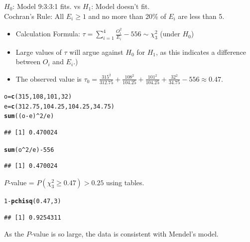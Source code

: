 \documentclass[t,xcolor=pdftex,dvipsnames,table]{beamer}\usepackage[]{graphicx}\usepackage[]{color}
\makeatletter
\newcommand{\hlnum}[1]{\textcolor[rgb]{0.686,0.059,0.569}{#1}}%
\newcommand{\hlopt}[1]{\textcolor[rgb]{0,0,0}{#1}}%
\newcommand{\hlstd}[1]{\textcolor[rgb]{0.345,0.345,0.345}{#1}}%
\newcommand{\hlkwb}[1]{\textcolor[rgb]{0.69,0.353,0.396}{#1}}%
\newcommand{\hlkwd}[1]{\textcolor[rgb]{0.737,0.353,0.396}{\textbf{#1}}}%
\newenvironment{kframe}{%
 \def\at@end@of@kframe{}%
 \ifinner\ifhmode%
  \def\at@end@of@kframe{\end{minipage}}%
  \begin{minipage}{\columnwidth}%
 \fi\fi%
 \def\FrameCommand##1{\hskip\@totalleftmargin \hskip-\fboxsep
 \colorbox{shadecolor}{##1}\hskip-\fboxsep
     \hskip-\linewidth \hskip-\@totalleftmargin \hskip\columnwidth}%
 \MakeFramed {\advance\hsize-\width
   \@totalleftmargin\z@ \linewidth\hsize
   \@setminipage}}%
 {\par\unskip\endMakeFramed%
 \at@end@of@kframe}
\newenvironment{knitrout}{}{} %
\makeatother
\begin{document}
\begin{frame}[fragile]{}

 $H_{0}$: Model 9:3:3:1 fits. vs $H_{1}$: Model doesn't fit. \\

 Cochran's Rule: All $E_{i} \geq 1$ and no more than 20\% of $E_{i}$ are less than 5. 

\begin{itemize}
\item Calculation Formula: $\tau = \sum_{i=1}^{4} \frac{O_{i}^2}{E_{i}} - 556 \sim \chi^2_{3}$ (under $H_{0}$)
\item Large values of $\tau$ will argue against $H_{0}$ for $H_{1}$, as this indicates a difference between $O_{i}$ and $E_{i}$.)
\item The observed value is $\tau_{0} = \frac{315^2}{312.75} + \frac{108^2}{104.25} + \frac{101^2}{104.25} + \frac{32^2}{34.75} - 556 \approx 0.47$. 
\end{itemize}

\begin{knitrout}
\color{fgcolor}\begin{kframe}
\begin{alltt}
\hlstd{o}\hlkwb{=}\hlkwd{c}\hlstd{(}\hlnum{315}\hlstd{,}\hlnum{108}\hlstd{,}\hlnum{101}\hlstd{,}\hlnum{32}\hlstd{)}
\hlstd{e}\hlkwb{=}\hlkwd{c}\hlstd{(}\hlnum{312.75}\hlstd{,}\hlnum{104.25}\hlstd{,}\hlnum{104.25}\hlstd{,}\hlnum{34.75}\hlstd{)}
\hlkwd{sum}\hlstd{((o}\hlopt{-}\hlstd{e)}\hlopt{^}\hlnum{2}\hlopt{/}\hlstd{e)}
\end{alltt}
\begin{verbatim}
## [1] 0.470024
\end{verbatim}
\begin{alltt}
\hlkwd{sum}\hlstd{(o}\hlopt{^}\hlnum{2}\hlopt{/}\hlstd{e)} \hlopt{-} \hlnum{556}
\end{alltt}
\begin{verbatim}
## [1] 0.470024
\end{verbatim}
\end{kframe}
\end{knitrout}
\end{frame}  


\begin{frame}[fragile]{}
 $P$-value = $P( \chi^2_{3} \geq 0.47) > 0.25 $ using tables.

\begin{knitrout}
\color{fgcolor}\begin{kframe}
\begin{alltt}
\hlnum{1}\hlopt{-}\hlkwd{pchisq}\hlstd{(}\hlnum{0.47}\hlstd{,}\hlnum{3}\hlstd{)}
\end{alltt}
\begin{verbatim}
## [1] 0.9254311
\end{verbatim}
\end{kframe}
\end{knitrout}


 As the $P$-value is so large, the data is consistent with Mendel's model.
\end{frame}  
\end{document}
